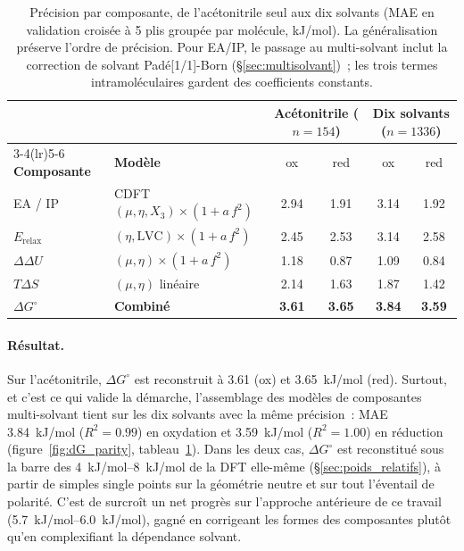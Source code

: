 \begin{table}[H]
\centering
\caption{Précision par composante, de l'acétonitrile seul aux dix solvants (MAE en validation croisée à 5 plis groupée par molécule, kJ/mol). La généralisation préserve l'ordre de précision. Pour EA/IP, le passage au multi-solvant inclut la correction de solvant Padé[1/1]-Born (§\ref{sec:multisolvant})~; les trois termes intramoléculaires gardent des coefficients constants.}
\label{tab:component_models}
\footnotesize
\begin{tabular}{llcccc}
\toprule
 & & \multicolumn{2}{c}{\textbf{Acétonitrile} ($n=154$)} & \multicolumn{2}{c}{\textbf{Dix solvants} ($n=1336$)} \\
\cmidrule(lr){3-4}\cmidrule(lr){5-6}
\textbf{Composante} & \textbf{Modèle} & ox & red & ox & red \\
\midrule
EA / IP & CDFT $(\mu, \eta, X_3)\times(1+a\,f^2)$ & 2.94 & 1.91 & 3.14 & 1.92 \\
$E_{\text{relax}}$ & $(\eta, \text{LVC})\times(1+a\,f^2)$ & 2.45 & 2.53 & 3.14 & 2.58 \\
$\Delta\Delta U$ & $(\mu, \eta)\times(1+a\,f^2)$ & 1.18 & 0.87 & 1.09 & 0.84 \\
$T\Delta S$ & $(\mu, \eta)$ linéaire & 2.14 & 1.63 & 1.87 & 1.42 \\
\midrule
$\Delta G^\circ$ & \textbf{Combiné} & \textbf{3.61} & \textbf{3.65} & \textbf{3.84} & \textbf{3.59} \\
\bottomrule
\end{tabular}
\end{table}

\paragraph{Résultat.}
Sur l'acétonitrile, $\Delta G^\circ$ est reconstruit à \SI{3.61}{} (ox) et \SI{3.65}{kJ/mol} (red). Surtout, et c'est ce qui valide la démarche, l'assemblage des modèles de composantes multi-solvant tient sur les dix solvants avec la même précision~: MAE \SI{3.84}{kJ/mol} ($R^2 = 0.99$) en oxydation et \SI{3.59}{kJ/mol} ($R^2 = 1.00$) en réduction (figure~\ref{fig:dG_parity}, tableau~\ref{tab:component_models}). Dans les deux cas, $\Delta G^\circ$ est reconstitué sous la barre des \SIrange{4}{8}{kJ/mol} de la DFT elle-même (§\ref{sec:poids_relatifs}), à partir de simples single points sur la géométrie neutre et sur tout l'éventail de polarité. C'est de surcroît un net progrès sur l'approche antérieure de ce travail (\SIrange{5.7}{6.0}{kJ/mol}), gagné en corrigeant les formes des composantes plutôt qu'en complexifiant la dépendance solvant.

